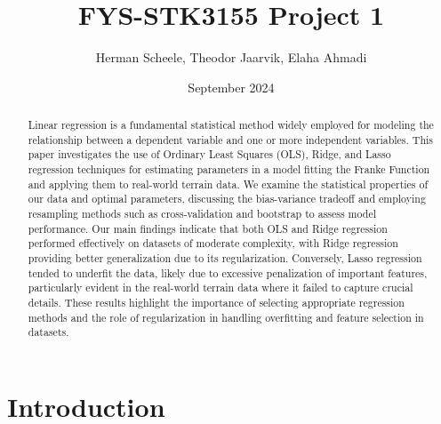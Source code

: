 \documentclass{article}
\title{FYS-STK3155 Project 1}
\author{Herman Scheele, Theodor Jaarvik, Elaha Ahmadi}
\date{September 2024}
\begin{document}
\maketitle

\begin{abstract}
Linear regression is a fundamental statistical method widely employed for modeling the relationship between a dependent variable and one or more independent variables. This paper investigates the use of Ordinary Least Squares (OLS), Ridge, and Lasso regression techniques for estimating parameters in a model fitting the Franke Function and applying them to real-world terrain data. We examine the statistical properties of our data and optimal parameters, discussing the bias-variance tradeoff and employing resampling methods such as cross-validation and bootstrap to assess model performance. Our main findings indicate that both OLS and Ridge regression performed effectively on datasets of moderate complexity, with Ridge regression providing better generalization due to its regularization. Conversely, Lasso regression tended to underfit the data, likely due to excessive penalization of important features, particularly evident in the real-world terrain data where it failed to capture crucial details. These results highlight the importance of selecting appropriate regression methods and the role of regularization in handling overfitting and feature selection in datasets.
\end{abstract}



\section{Introduction}
\end{document}
